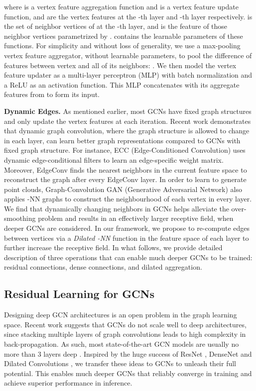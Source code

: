 \documentclass[10pt,twocolumn,letterpaper]{article}
\newcommand{\mysection}[1]{\vspace{3pt}\noindent\textbf{#1.}}
\begin{document}
where  is a vertex feature aggregation function and  is a vertex feature update function,  and  are the vertex features at the -th layer and -th layer respectively.  is the set of neighbor vertices of  at the -th layer, and  is the feature of those neighbor vertices parametrized by .  contains the learnable parameters of these functions. For simplicity and without loss of generality, we use a max-pooling vertex feature aggregator, without learnable parameters, to pool the difference of features between vertex  and all of its neighbors: . We then model the vertex feature updater  as a multi-layer perceptron (MLP) with batch normalization \cite{ioffe2015batch} and a ReLU as an activation function. This MLP concatenates  with its aggregate features from  to form its input.

\mysection{Dynamic Edges} \label{dyna} As mentioned earlier, most GCNs have fixed graph structures and only update the vertex features at each iteration. Recent work \cite{simonovsky2017dynamic,wang2018dynamic,valsesia2018learning} demonstrates that dynamic graph convolution, where the graph structure is allowed to change in each layer, can learn better graph representations compared to GCNs with fixed graph structure. For instance, ECC (Edge-Conditioned
Convolution) \cite{simonovsky2017dynamic} uses dynamic edge-conditional filters to learn an edge-specific weight matrix. Moreover, EdgeConv \cite{wang2018dynamic} finds the nearest neighbors in the current feature space to reconstruct the graph after every EdgeConv layer. In order to learn to generate point clouds, Graph-Convolution GAN (Generative Adversarial Network) \cite{valsesia2018learning} also applies -NN graphs to construct the neighbourhood of each vertex in every layer. We find that dynamically changing neighbors in GCNs helps alleviate the over-smoothing problem and results in an effectively larger receptive field, when deeper GCNs are considered. In our framework, we propose to re-compute edges between vertices via a \emph{Dilated -NN} function in the feature space of each layer to further increase the receptive field. 
In what follows, we provide detailed description of three operations that can enable much deeper GCNs to be trained: residual connections, dense connections, and dilated aggregation.

\subsection{Residual Learning for GCNs} \label{sec:ResGCN}
Designing deep GCN architectures \cite{wu2019comprehensive, zhou2018graph} is an open problem in the graph learning space. Recent work \cite{li2018deeper, wu2019comprehensive, zhou2018graph} suggests that GCNs do not scale well to deep architectures, since stacking multiple layers of graph convolutions leads to high complexity in back-propagation. As such, most state-of-the-art GCN models are usually no more than 3 layers deep \cite{zhou2018graph}. Inspired by the huge success of ResNet \cite{he2016deep}, DenseNet \cite{huang2017densely} and Dilated Convolutions \cite{yu2015multi}, we transfer these ideas to GCNs to unleash their full potential. This enables much deeper GCNs that reliably converge in training and achieve superior performance in inference. 
\end{document}
